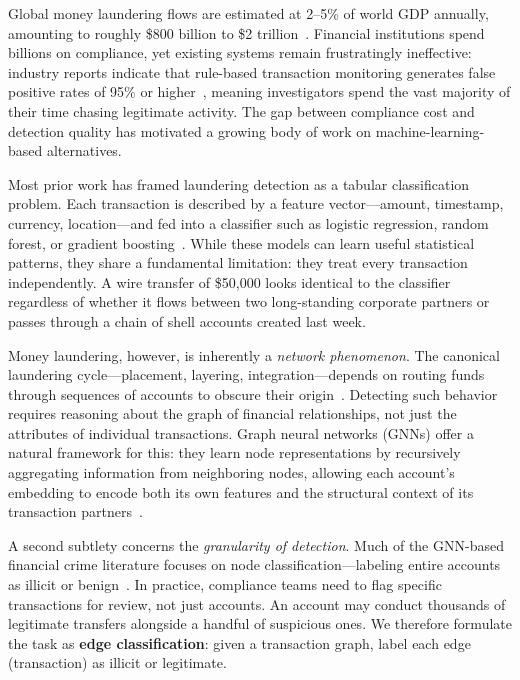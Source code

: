 \documentclass[conference]{IEEEtran}
\begin{document}
Global money laundering flows are estimated at 2--5\% of world GDP annually, amounting to roughly \$800 billion to \$2 trillion~\cite{unodc2011}. Financial institutions spend billions on compliance, yet existing systems remain frustratingly ineffective: industry reports indicate that rule-based transaction monitoring generates false positive rates of 95\% or higher~\cite{deloitte2020aml}, meaning investigators spend the vast majority of their time chasing legitimate activity. The gap between compliance cost and detection quality has motivated a growing body of work on machine-learning-based alternatives.

Most prior work has framed laundering detection as a tabular classification problem. Each transaction is described by a feature vector—amount, timestamp, currency, location—and fed into a classifier such as logistic regression, random forest, or gradient boosting~\cite{chen2018xgboost, jullum2020detecting}. While these models can learn useful statistical patterns, they share a fundamental limitation: they treat every transaction independently. A wire transfer of \$50{,}000 looks identical to the classifier regardless of whether it flows between two long-standing corporate partners or passes through a chain of shell accounts created last week.

Money laundering, however, is inherently a \textit{network phenomenon}. The canonical laundering cycle—placement, layering, integration—depends on routing funds through sequences of accounts to obscure their origin~\cite{fatf2012}. Detecting such behavior requires reasoning about the graph of financial relationships, not just the attributes of individual transactions. Graph neural networks (GNNs) offer a natural framework for this: they learn node representations by recursively aggregating information from neighboring nodes, allowing each account's embedding to encode both its own features and the structural context of its transaction partners~\cite{hamilton2017graphsage, kipf2017gcn}.

A second subtlety concerns the \textit{granularity of detection}. Much of the GNN-based financial crime literature focuses on node classification—labeling entire accounts as illicit or benign~\cite{weber2019bitcoin, pareja2020evolvegcn}. In practice, compliance teams need to flag specific transactions for review, not just accounts. An account may conduct thousands of legitimate transfers alongside a handful of suspicious ones. We therefore formulate the task as \textbf{edge classification}: given a transaction graph, label each edge (transaction) as illicit or legitimate.
\end{document}
